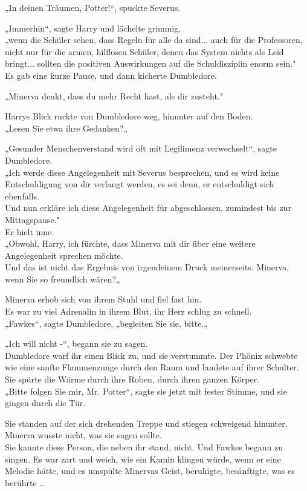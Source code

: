 {„In deinen Träumen, Potter!“, spuckte Severus.

„Immerhin“, sagte Harry und lächelte grimmig,\\ „wenn die Schüler sehen, dass Regeln für alle da sind... auch für die Professoren, nicht nur für die armen, hilflosen Schüler, denen das System nichts als Leid bringt... sollten die positiven Auswirkungen auf die Schuldisziplin enorm sein."\\ Es gab eine kurze Pause, und dann kicherte Dumbledore.

„Minerva denkt, dass du mehr Recht hast, als dir zusteht."

Harrys Blick ruckte von Dumbledore weg, hinunter auf den Boden.\\ „Lesen Sie etwa ihre Gedanken?„

„Gesunder Menschenverstand wird oft mit Legilimenz verwechselt“, sagte Dumbledore.\\ „Ich werde diese Angelegenheit mit Severus besprechen, und es wird keine Entschuldigung von dir verlangt werden, es sei denn, er entschuldigt sich ebenfalls.\\ Und nun erkläre ich diese Angelegenheit für abgeschlossen, zumindest bis zur Mittagspause."\\ Er hielt inne.\\ „Obwohl, Harry, ich fürchte, dass Minerva mit dir über eine weitere Angelegenheit sprechen möchte.\\ Und das ist nicht das Ergebnis von irgendeinem Druck meinerseits. Minerva, wenn Sie so freundlich wären?„

Minerva erhob sich von ihrem Stuhl und fiel fast hin.\\ Es war zu viel Adrenalin in ihrem Blut, ihr Herz schlug zu schnell.\\ „Fawkes“, sagte Dumbledore, „begleiten Sie sie, bitte.„

„Ich will nicht -“, begann sie zu sagen.\\ Dumbledore warf ihr einen Blick zu, und sie verstummte. Der Phönix schwebte wie eine sanfte Flammenzunge durch den Raum und landete auf ihrer Schulter.\\ Sie spürte die Wärme durch ihre Roben, durch ihren ganzen Körper.\\ „Bitte folgen Sie mir, Mr. Potter“, sagte sie jetzt mit fester Stimme, und sie gingen durch die Tür.

Sie standen auf der sich drehenden Treppe und stiegen schweigend hinunter. Minerva wusste nicht, was sie sagen sollte.\\ Sie kannte diese Person, die neben ihr stand, nicht. Und Fawkes begann zu singen. Es war zart und weich, wie ein Kamin klingen würde, wenn er eine Melodie hätte, und es umspülte Minervas Geist, beruhigte, besänftigte, was es berührte …

}
